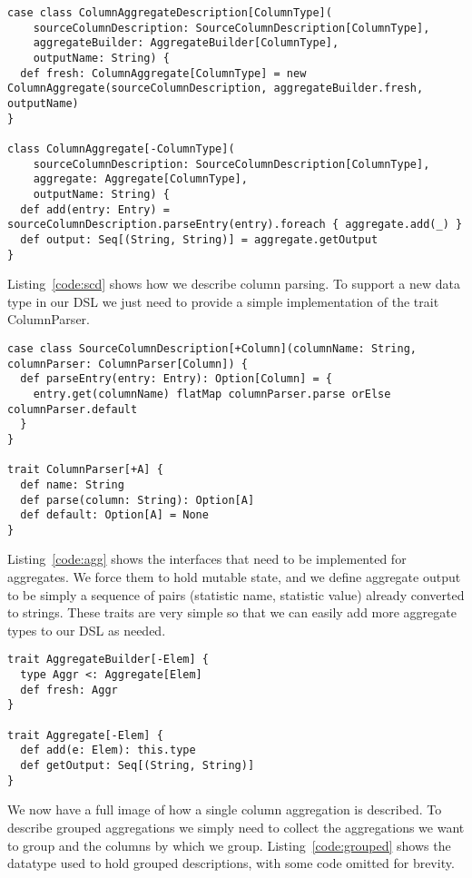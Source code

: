 \begin{lstlisting}[caption=ColumnAggregateDescription, label=code:cad]
case class ColumnAggregateDescription[ColumnType](
    sourceColumnDescription: SourceColumnDescription[ColumnType],
    aggregateBuilder: AggregateBuilder[ColumnType],
    outputName: String) {
  def fresh: ColumnAggregate[ColumnType] = new ColumnAggregate(sourceColumnDescription, aggregateBuilder.fresh, outputName)
}

class ColumnAggregate[-ColumnType](
    sourceColumnDescription: SourceColumnDescription[ColumnType],
    aggregate: Aggregate[ColumnType],
    outputName: String) {
  def add(entry: Entry) = sourceColumnDescription.parseEntry(entry).foreach { aggregate.add(_) }
  def output: Seq[(String, String)] = aggregate.getOutput
}
\end{lstlisting}

Listing~\ref{code:scd} shows how we describe column parsing. To support a new data type in our DSL we just need to provide a simple implementation of the trait ColumnParser.

\begin{lstlisting}[caption=SourceColumnDescription, label=code:scd]
case class SourceColumnDescription[+Column](columnName: String, columnParser: ColumnParser[Column]) {
  def parseEntry(entry: Entry): Option[Column] = {
    entry.get(columnName) flatMap columnParser.parse orElse columnParser.default
  }
}

trait ColumnParser[+A] {
  def name: String
  def parse(column: String): Option[A]
  def default: Option[A] = None
}
\end{lstlisting}

Listing~\ref{code:agg} shows the interfaces that need to be implemented for aggregates. We force them to hold mutable state, and we define aggregate output to be simply a sequence of pairs (statistic name, statistic value) already converted to strings. These traits are very simple so that we can easily add more aggregate types to our DSL as needed.

\begin{lstlisting}[caption=Aggregate, label=code:agg, float]
trait AggregateBuilder[-Elem] {
  type Aggr <: Aggregate[Elem]
  def fresh: Aggr
}

trait Aggregate[-Elem] {
  def add(e: Elem): this.type
  def getOutput: Seq[(String, String)]
}
\end{lstlisting}

We now have a full image of how a single column aggregation is described. To describe grouped aggregations we simply need to collect the aggregations we want to group and the columns by which we group. Listing~\ref{code:grouped} shows the datatype used to hold grouped descriptions, with some code omitted for brevity.

